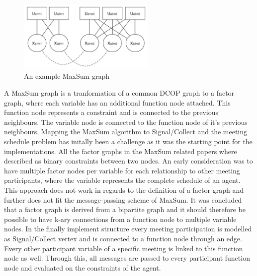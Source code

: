 \begin{figure}[H]
\includegraphics[width=250px]{graphics/maxsum_graph}
\centering
\caption{An example MaxSum graph}
\label{fig:maxsum_graph}
\end{figure}

A MaxSum graph is a tranformation of a common DCOP graph to a factor graph, where each variable has an additional function node attached. This function node represents a constraint and is connected to the previous neighbours. The variable node is connected to the function node of it's previous neighbours. Mapping the MaxSum algorithm to Signal/Collect and the meeting schedule problem has initally been a challenge as it was the starting point for the implementations. All the factor graphs in the MaxSum related papers where described as binary constraints between two nodes. An early consideration was to have multiple factor nodes per variable for each relationship to other meeting participants, where the variable represents the complete schedule of an agent.  This approach does not work in regards to the definition of a factor graph and further does not fit the message-passing scheme of MaxSum. It was concluded that a factor graph is derived from a bipartite graph and it should therefore be possible to have k-ary connections from a function node to multiple variable nodes. In the finally implement structure every meeting participation is modelled as Signal/Collect vertex and is connected to a function node through an edge. Every other participant variable of a specific meeting is linked to this function node as well. Through this, all messages are passed to every participant function node and evaluated on the constraints of the agent.

